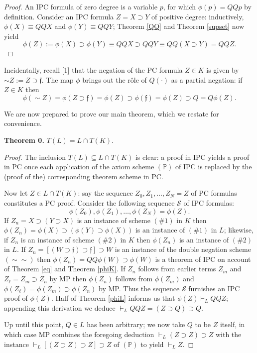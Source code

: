 \documentclass[10pt]{amsart}
\theoremstyle{plain}
\numberwithin{equation}{section}
\begin{document}
\begin{proof} 
An IPC formula of zero degree is a variable $p$, for which $\phi (p) = QQ p$ by definition. Consider an IPC formula $Z = X \supset Y$ of positive degree: inductively, $\phi (X) \equiv QQ X$ and $\phi (Y) \equiv QQ Y$; Theorem \ref{QQ} and Theorem \ref{supset} now yield 
$$\phi (Z) := \phi (X) \supset \phi (Y) \equiv QQ X \supset QQ Y \equiv QQ (X \supset Y) = QQ Z.$$
\end{proof} 

\medbreak 

Incidentally, recall [1] that the negation of the PC formula $Z \in K$ is given by $\sim Z := Z \supset \mathfrak{f}$. The map $\phi$ brings out the r\^ole of $Q( \cdot )$ as a partial negation: if $Z \in K$ then 
$$\phi (\sim Z) = \phi (Z \supset \mathfrak{f}) = \phi (Z) \supset \phi(\mathfrak{f}) = \phi(Z) \supset Q = Q \phi(Z).$$

\medbreak 

We are now prepared to prove our main theorem, which we restate for convenience. 

\medbreak 

\medbreak

\noindent
{\bf Theorem 0.} $T(L) = L \cap T(K)$. 

\begin{proof} 
The inclusion $T(L) \subseteq L \cap T(K)$ is clear: a proof in IPC yields a proof in PC once each application of the axiom scheme $(\mathbb{P})$ of IPC is replaced by the (proof of the) corresponding theorem scheme in PC. 

\medbreak 

Now let $Z \in L \cap T(K)$: say the sequence $Z_0, Z_1, \dots , Z_N = Z$ of PC formulas constitutes a PC proof. Consider the following sequence $\mathcal{S}$ of IPC formulas: 
$$\phi (Z_0), \phi (Z_1), \dots , \phi (Z_N) = \phi (Z).$$
If $Z_n = X \supset (Y \supset X)$ is an instance of scheme $(\#1)$ in $K$ then $\phi (Z_n) = \phi (X) \supset (\phi (Y) \supset \phi (X))$ is an instance of $(\#1)$ in $L$; likewise, if $Z_n$ is an instance of scheme $(\#2)$ in $K$ then $\phi (Z_n)$ is an instance of $(\#2)$ in $L$. If $Z_n = [(W \supset \mathfrak{f}) \supset \mathfrak{f}] \supset W$ is an instance of the double negation scheme $(\sim \sim)$ then $\phi (Z_n) = QQ \phi (W) \supset \phi (W)$ is a theorem of IPC on account of Theorem \ref{eq} and Theorem \ref{phiK}. If $Z_n$ follows from earlier terms $Z_m$ and $Z_{\ell} = Z_m \supset Z_n$ by MP then $\phi (Z_n)$ follows from $\phi(Z_m)$ and $\phi (Z_{\ell}) = \phi (Z_m) \supset \phi (Z_n)$ by MP. Thus the sequence $\mathcal{S}$ furnishes an IPC proof of $\phi (Z)$. Half of Theorem \ref{phiL} informs us that $\phi (Z) \vdash_L QQ Z$; appending this derivation we deduce $\vdash_L QQ Z = (Z \supset Q) \supset Q$. 

\medbreak 

Up until this point, $Q \in L$ has been arbitrary; we now take $Q$ to be $Z$ itself, in which case MP combines the foregoing deduction $\vdash_L (Z \supset Z) \supset Z$ with the instance $\vdash_L [(Z \supset Z) \supset Z] \supset Z$ of $(\mathbb{P})$ to yield $\vdash_L Z$. 
\end{proof} 
\end{document}
